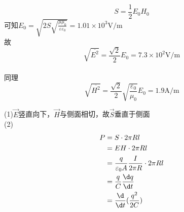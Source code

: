 \documentclass{phyasgn}
\begin{document}
\begin{sol}[6-4]
    $$S=\frac{1}{2}E_0H_0$$
    可知$E_0=\sqrt{2S\sqrt{\frac{\mu\mu_0}{\varepsilon\varepsilon_0}}}=1.01\times10^3\text{V/m}$\\
    故$$\sqrt{\overline{E^2}}=\frac{\sqrt{2}}{2}E_0=7.3\times10^2\text{V/m}$$\\
    同理$$\sqrt{\overline{H^2}}=\frac{\sqrt{2}}{2}\sqrt{\frac{\varepsilon_0}{\mu_0}}E_0=1.9\text{A/m}$$
\end{sol}\par

\begin{sol}[6-9]
    (1)$\vec{E}$竖直向下，$\vec{H}$与侧面相切，故$\vec{S}$垂直于侧面\\
    (2)$$\begin{aligned}
        P&=S\cdot 2\pi Rl\\
        &=EH\cdot 2\pi Rl\\
        &=\frac{q}{\varepsilon_0A}\frac{I}{2\pi R}\cdot 2\pi Rl\\
        &=\frac{q}{C}\frac{\d q}{\d t}\\
        &=\frac{\d }{\d t}(\frac{q^2}{2C})
    \end{aligned}$$
\end{sol}\par
\end{document}
